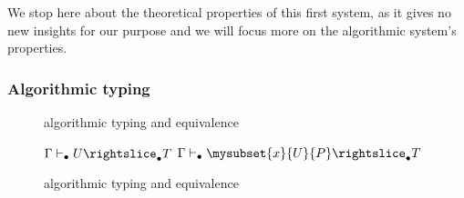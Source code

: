 \documentclass[twocolumn]{article}
\renewcommand{\SubSubAs}[1][\Gamma]{%
\UAX{SubSub}
{$\subalgoimpl{#1}{c}{U}{T}$}
{$\subalgoimpl{#1}{c[\eltpit~\ctxdot]}{\mysubset{x}{U}{P}}{T}$}
{}
}
\begin{document}
We stop here about the theoretical properties of this first system, as
it gives no new insights for our purpose and we will focus more on the
algorithmic system's properties.

\subsubsection{Algorithmic typing}
\begin{figure*}[t]
  \def\infvspace{0.5em}
    \def\type{\typea}
    \def\subt{\subta}
    \def\sub{\suba}
    
    \begin{center}
    \WfEmpty\DP
    
    \vspace{\infvspace}
    \WfVar\DP
    
    \vspace{\infvspace}
    \Var\DP
    
    \vspace{\infvspace}
    \PropSet\DP
    
    \vspace{\infvspace}
    \Prod\DP

    \vspace{\infvspace}
    \Abs\DP

    \vspace{\infvspace}
    \AppA\DP

    \vspace{\infvspace}
    \SigmaR\DP
    
    \vspace{\infvspace}
    \SumDepA\DP

    \vspace{\infvspace}
    \PiLeftA\DP
    
    \vspace{\infvspace}
    \PiRightA\DP

    \SubsetR\DP
    \end{center}
  \caption{\Russell{} algorithmic typing and equivalence}
  \label{fig:typing-algo-rules}
\end{figure*}

\begin{figure*}
    \def\fCenter{\suba}
    \def\type{\typea}
    \def\sub{\suba}
    \begin{center}
    \SubConvA\DP 

    \vspace{\infvspace}
    \SubHnfA\DP

    \vspace{\infvspace}
    \SubProdA\DP
    \quad
    \SubSigmaA\DP

    \vspace{\infvspace}
    \SubProofA\DP
    \quad
    \SubSubAs\DP
  \end{center}
  \caption{\Russell{} algorithmic typing and equivalence}
  \label{fig:subtyping-algo-rules}
\end{figure*}
\end{document}
